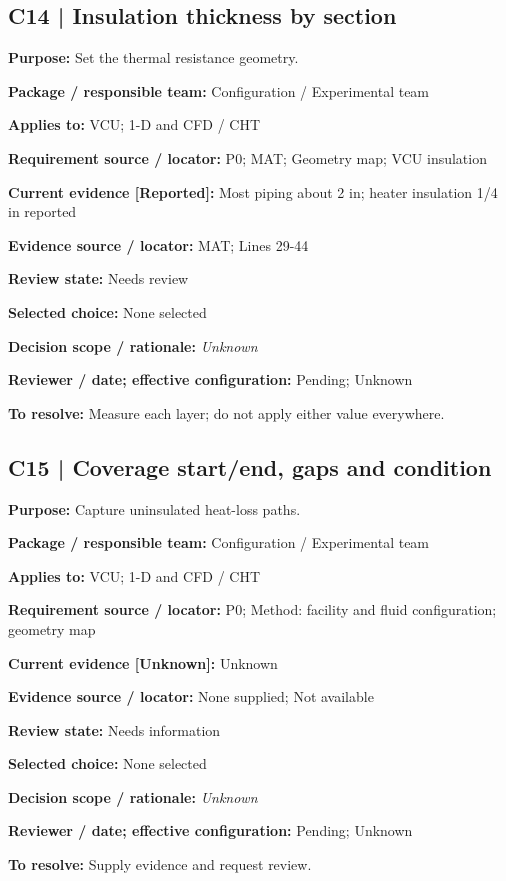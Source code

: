 \documentclass[11pt]{article}
\begin{document}
\begin{minipage}{\textwidth}\small\setlength{\parskip}{2pt}
\subsection*{C14 | Insulation thickness by section}
\textbf{Purpose:} Set the thermal resistance geometry.\par
\textbf{Package / responsible team:} Configuration / Experimental team\par
\textbf{Applies to:} VCU; 1-D and CFD / CHT\par
\textbf{Requirement source / locator:} P0; MAT; Geometry map; VCU insulation\par
\textbf{Current evidence [Reported]:} Most piping about 2 in; heater insulation 1/4 in reported\par
\textbf{Evidence source / locator:} MAT; Lines 29-44\par
\textbf{Review state:} Needs review\par
\textbf{Selected choice:} None selected\par
\textbf{Decision scope / rationale:} \textit{Unknown}\par
\textbf{Reviewer / date; effective configuration:} Pending; Unknown\par
\textbf{To resolve:} Measure each layer; do not apply either value everywhere.\par
\end{minipage}\par\vspace{5pt}
\begin{minipage}{\textwidth}\small\setlength{\parskip}{2pt}
\subsection*{C15 | Coverage start/end, gaps and condition}
\textbf{Purpose:} Capture uninsulated heat-loss paths.\par
\textbf{Package / responsible team:} Configuration / Experimental team\par
\textbf{Applies to:} VCU; 1-D and CFD / CHT\par
\textbf{Requirement source / locator:} P0; Method: facility and fluid configuration; geometry map\par
\textbf{Current evidence [Unknown]:} Unknown\par
\textbf{Evidence source / locator:} None supplied; Not available\par
\textbf{Review state:} Needs information\par
\textbf{Selected choice:} None selected\par
\textbf{Decision scope / rationale:} \textit{Unknown}\par
\textbf{Reviewer / date; effective configuration:} Pending; Unknown\par
\textbf{To resolve:} Supply evidence and request review.\par
\end{minipage}\par\vspace{5pt}
\end{document}
